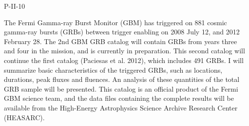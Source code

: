 P-II-10


\bigskip



\bigskip

\noindent The Fermi Gamma-ray Burst Monitor (GBM) has triggered on 881 cosmic gamma-ray bursts (GRBs) between trigger enabling on  2008 July 12, and 2012 February 28. The 2nd GBM GRB catalog will contain GRBs from years three and four in the mission, and is currently in preparation. This second catalog will continue the first catalog (Paciesas et al. 2012), which includes 491 GRBs. I will summarize basic characteristics of the triggered GRBs, such as locations, durations, peak fluxes and fluences. An analysis of these quantities of the total GRB sample will be presented. This catalog is an official product of the Fermi GBM science team, and the data files containing the complete results will be available from the High-Energy Astrophysics Science Archive Research Center (HEASARC).
